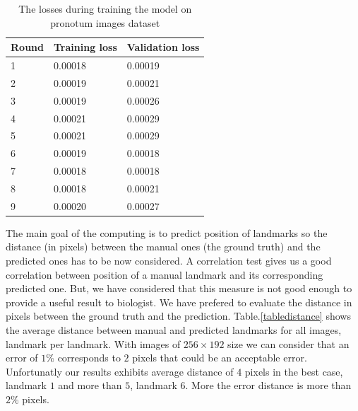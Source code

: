 \documentclass[10pt]{article}
\begin{document}
\begin{table}[h!]
	\centering
	\begin{tabular}{l l l}
	Round & Training loss & Validation loss \\ \hline
	1 & 0.00018 & 0.00019  \\ \hline
	2 & 0.00019 & 0.00021 \\ \hline
	3 & 0.00019 & 0.00026 \\ \hline
	4 & 0.00021 & 0.00029 \\ \hline
	5 & 0.00021 & 0.00029 \\ \hline
	6 & 0.00019 & 0.00018 \\ \hline
	7 & 0.00018 & 0.00018 \\ \hline
	8 & 0.00018 & 0.00021 \\ \hline
	9 & 0.00020 & 0.00027 \\ \hline
	\end{tabular}
	\caption{The losses during training the model on pronotum images dataset}
	\label{tbltrainingloss}
\end{table}

The main goal of the computing is to predict position of landmarks so
the distance (in pixels) between the manual ones (the ground truth)
and the predicted ones has to be now considered. A correlation test
gives us a good correlation between position of a manual landmark and
its corresponding predicted one. But, we have considered that this
measure is not good enough to provide a useful result to biologist. We
have prefered to evaluate the distance in pixels between the ground
truth and the prediction. Table.\ref{tabledistance} shows the
average distance between manual and predicted landmarks for all
images, landmark per landmark. With images of $256 \times 192$ size we
can consider that an error of $1\%$ corresponds to $2$ pixels that
could be an acceptable error. Unfortunatly our results exhibits
average distance of $4$ pixels in the best case, landmark $1$ and more
than $5$, landmark $6$. More the error distance is more than  $2\%$
pixels.
\end{document}
